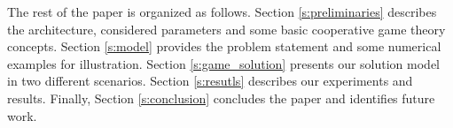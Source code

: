 \documentclass[10pt,journal,cspaper,compsoc]{IEEEtran}
\begin{document}
The rest of the paper is organized as follows. Section
\ref{s:preliminaries} describes the architecture, considered
parameters and some basic cooperative game theory concepts.
Section \ref{s:model} provides the problem statement and some
numerical examples for illustration. Section \ref{s:game_solution}
presents our solution model in two different scenarios. Section
\ref{s:resutls} describes our experiments and results. Finally,
Section \ref{s:conclusion} concludes the paper and identifies
future work.

%
%



%
%
%
%
\end{document}
